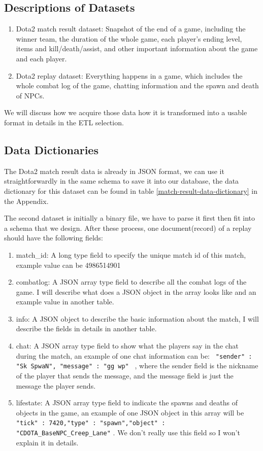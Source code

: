 \documentclass{article}
\newcommand{\codeinline}[1]{
    \texttt{#1}
}
\begin{document}
\subsection{Descriptions of Datasets}

\begin{enumerate}
\item Dota2 match result dataset: Snapshot of the end of a game, including the winner team, the duration of the whole game, each player's ending level, items and kill/death/assist, and other important information about the game and each player.
\item Dota2 replay dataset: Everything happens in a game, which includes the whole combat log of the game, chatting information and the spawn and death of NPCs.
\end{enumerate}

We will discuss how we acquire those data how it is transformed into a usable format in details in the ETL selection.

\subsection{Data Dictionaries}

The Dota2 match result data is already in JSON format, we can use it straightforwardly in the same schema to save it into our database, the data dictionary for this dataset can be found in table \ref{match-result-data-dictionary} in the Appendix.


The second dataset is initially a binary file, we have to parse it first then fit into a schema that we design. After these process, one document(record) of a replay should have the following fields:
\begin{enumerate}
\item match\_id: A long type field to specify the unique match id of this match, example value can be 4986514901
\item combatlog: A JSON array type field to describe all the combat logs of the game. I will describe what does a JSON object in the array looks like and an example value in another table.
\item info: A JSON object to describe the basic information about the match, I will describe the fields in details in another table.
\item chat: A JSON array type field to show what the players say in the chat during the match, an example of one chat information can be: \codeinline{{ "sender" : "Sk SpwaN", "message" : "gg wp" }}, where the sender field is the nickname of the player that sends the message, and the message field is just the message the player sends.
\item lifestate: A JSON array type field to indicate the spawns and deaths of objects in the game, an example of one JSON object in this array will be \\
\codeinline{{"tick" : 7420,"type" : "spawn","object" : "CDOTA_BaseNPC_Creep_Lane"}}. We don't really use this field so I won't explain it in details.
\end{enumerate}
\end{document}
